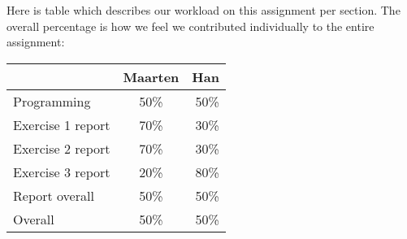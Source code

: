 \addtocounter{exerciseCount}{1} \noindent {} \par
Here is table which describes our workload on this assignment per section.
The overall percentage is how we feel we contributed individually to the entire assignment:

\begin{center}
	\begin{tabular}{ l | c | r }
	    & Maarten & Han \\ \hline
	  Programming & 50\% & 50\% \\
	  \hline
	  Exercise 1 report & 70\% & 30\% \\
	  Exercise 2 report & 70\% & 30\% \\
	  Exercise 3 report & 20\% & 80\% \\
	  \hline
	  Report overall & 50\% & 50\% \\ \hline \hline
	  Overall & 50\% & 50\%
	\end{tabular}
\end{center}